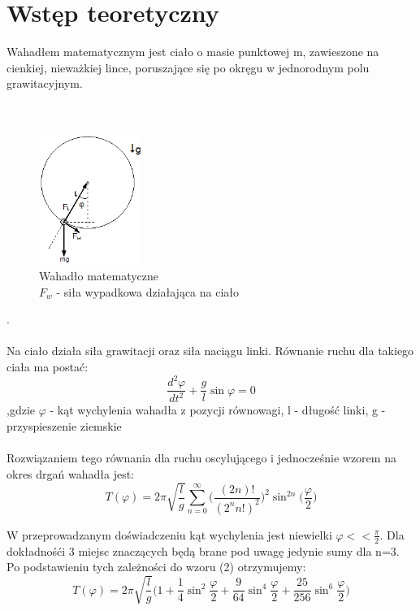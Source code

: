 \documentclass[a4paper,10pt]{article}
\begin{document}
\section{Wstęp teoretyczny}
Wahadłem matematycznym jest ciało o masie punktowej m, zawieszone na cienkiej, nieważkiej lince, poruszające się po okręgu w jednorodnym polu grawitacyjnym.
\\
\\
\\
\begin{figure}[H]
\centering
\includegraphics[width=0.3\textwidth]{wahadlo.png}
\caption{Wahadło matematyczne \\$F_w$ - siła wypadkowa działająca na ciało}
\end{figure}.
\\
\\Na ciało działa siła grawitacji oraz siła naciągu linki. Równanie ruchu dla takiego ciała ma postać:
\begin{equation}
\frac{d^2\varphi}{dt^2} + \frac{g}{l}\sin\varphi = 0
\end{equation}
,gdzie $\varphi$ - kąt wychylenia wahadła z pozycji równowagi, l - długość linki, g - przyspieszenie ziemskie
\\
\\Rozwiązaniem tego równania dla ruchu oscylującego i jednocześnie wzorem na okres drgań wahadła jest:
\begin{equation}
T(\varphi) = 2\pi\sqrt{\frac{l}{g}}\sum_{n=0}^{\infty}\bigg(\frac{(2n)!}{(2^nn!)^2}\bigg)^2\sin^{2n}\bigg(\frac{\varphi}{2}\bigg)
\end{equation}

W przeprowadzanym doświadczeniu kąt wychylenia jest niewielki $\varphi<<\frac{\pi}{2}$. Dla dokładnośći 3 miejsc znaczących będą brane pod uwagę jedynie sumy dla n=3. Po podstawieniu tych zależności do wzoru (2) otrzymujemy:
\begin{equation}
T(\varphi) = 2\pi\sqrt{\frac{l}{g}}\bigg(1+\frac{1}{4}\sin^2\frac{\varphi}{2}+\frac{9}{64}\sin^4\frac{\varphi}{2}+\frac{25}{256}\sin^6\frac{\varphi}{2}\bigg)
\end{equation}
\end{document}

